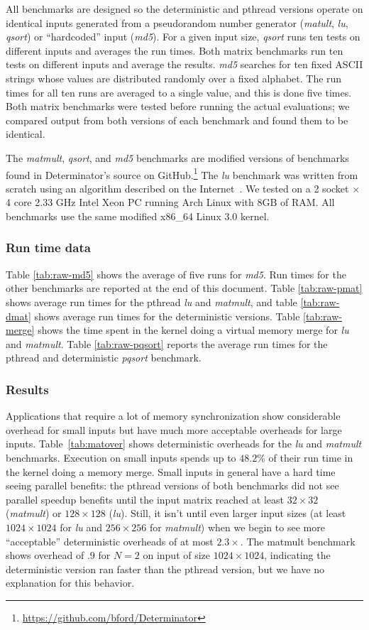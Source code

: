 All benchmarks are designed so the deterministic and pthread versions operate on
identical inputs generated from a pseudorandom number generator (\emph{matult},
\emph{lu}, \emph{qsort}) or ``hardcoded'' input (\emph{md5}).
For a given input size, \emph{qsort} runs ten tests on different inputs and
averages the run times. Both matrix benchmarks run ten tests on different inputs
and average the results. \emph{md5} searches for ten fixed ASCII strings
whose values are distributed randomly over a fixed alphabet. The run times for
all ten runs are averaged to a single value, and this is done five times.
Both matrix benchmarks were tested before running the actual evaluations;
we compared output from both versions of each benchmark and found them to be
identical.

The \emph{matmult}, \emph{qsort}, and \emph{md5} benchmarks are modified
versions of benchmarks found in Determinator's source on
GitHub.\footnote{\url{https://github.com/bford/Determinator}}
The \emph{lu} benchmark was written from scratch using an algorithm described
on the Internet~\cite{lualg}. We tested on a 2 socket $\times$ 4 core 2.33 GHz
Intel Xeon PC running Arch Linux with 8GB of RAM. All benchmarks use the same
modified \mbox{x86\_64} Linux 3.0 kernel.

\subsubsection{Run time data}
Table \ref{tab:raw-md5} shows the average of five runs for \emph{md5}.
Run times for the other benchmarks are reported at the end of this document.
Table \ref{tab:raw-pmat} shows average run times for the pthread
\emph{lu} and \emph{matmult}, and table \ref{tab:raw-dmat} shows average run
times for the deterministic versions. Table \ref{tab:raw-merge} shows the time
spent in the kernel doing a virtual memory merge for \emph{lu} and
\emph{matmult}. Table \ref{tab:raw-pqsort} reports the average run times for the
pthread and deterministic \emph{pqsort} benchmark.

\subsubsection{Results}
Applications that require a lot of memory synchronization show considerable
overhead for small inputs but have much more acceptable overheads for large
inputs.
\mbox{Table \ref{tab:matover}} shows deterministic overheads for the \emph{lu}
and \emph{matmult} benchmarks.
Execution on small inputs spends up to $48.2\%$ of their run time in the kernel
doing a memory merge.
Small inputs in general have a hard time seeing parallel benefits: the pthread
versions of both benchmarks did not see parallel speedup benefits until the
input matrix reached at least $32\times 32$ (\emph{matmult}) or $128\times 128$
(\emph{lu}). Still, it isn't until even larger
input sizes (at least $1024\times 1024$ for \emph{lu} and $256\times 256$ for
\emph{matmult}) when we begin to
see more ``acceptable'' deterministic overheads of at
most $2.3\times$. The matmult benchmark shows overhead of .9 for $N=2$ on input
of size $1024\times 1024$, indicating the deterministic version ran faster than
the pthread version, but we have no explanation for this behavior.

